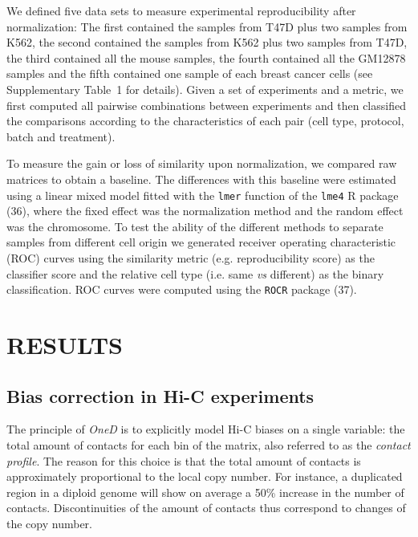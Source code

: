 \documentclass[a4,center,fleqn]{NAR}
\providecommand{\DIFadd}[1]{{\protect\color{red}#1}} %
\providecommand{\DIFdel}[1]{{\protect}}                      %
\providecommand{\DIFaddbegin}{} %
\providecommand{\DIFaddend}{} %
\providecommand{\DIFdelbegin}{} %
\providecommand{\DIFdelend}{} %
\begin{document}
We defined \DIFdelbegin \DIFdel{three }\DIFdelend \DIFaddbegin \DIFadd{five }\DIFaddend data sets to measure experimental reproducibility after
normalization: The first contained the samples from T47D plus two samples
from K562, the second contained the samples from K562 plus two samples
from T47D, the third contained all the mouse samples\DIFdelbegin \DIFdel{(see Table
\ref{tab:samples} }\DIFdelend \DIFaddbegin \DIFadd{, the fourth contained
all the GM12878 samples and the fifth contained one sample of each breast
cancer cells (see Supplementary Table~1 }\DIFaddend for details). Given a set of
experiments and a metric, we first computed all pairwise combinations
between experiments and then classified the comparisons according to the
characteristics of each pair (cell type, protocol, batch and treatment).

To measure the gain or loss of similarity upon normalization, we compared
raw matrices to obtain a baseline. The differences with this baseline were
estimated using a linear mixed model fitted with the \texttt{lmer}
function of the \texttt{lme4} R package (\DIFdelbegin \DIFdel{37}\DIFdelend \DIFaddbegin \DIFadd{36}\DIFaddend ), where the
fixed effect was the normalization method and the random effect was the
chromosome. \DIFdelbegin \DIFdel{Receiver }\DIFdelend \DIFaddbegin \DIFadd{To test the ability of the different methods to separate
samples from different cell origin we generated receiver }\DIFaddend operating
characteristic (ROC) curves \DIFaddbegin \DIFadd{using the similarity metric (e.g.
reproducibility score) as the classifier score and the relative cell type
(i.e. same }\textit{\DIFadd{vs}} \DIFadd{different) as the binary classification. ROC curves
}\DIFaddend were computed using the \texttt{ROCR} package (\DIFdelbegin \DIFdel{38}\DIFdelend \DIFaddbegin \DIFadd{37}\DIFaddend ).

\section{RESULTS}

\subsection{\DIFdelbegin \DIFdel{Experimental bias }\DIFdelend \DIFaddbegin \DIFadd{Bias }\DIFaddend correction \DIFaddbegin \DIFadd{in Hi-C experiments}\DIFaddend }

The principle of \textit{OneD} is to explicitly model Hi-C biases on a
single variable: the total amount of contacts for each bin of the matrix\DIFdelbegin \DIFdel{(see \ref{sec:model} for detail)}\DIFdelend \DIFaddbegin \DIFadd{,
also referred to as the }\textit{\DIFadd{contact profile}}\DIFaddend . The reason for this
choice is that the total amount of contacts is approximately proportional
to the local copy number. For instance, a duplicated region in a diploid
genome will show on average a 50\% increase in the number of contacts.
Discontinuities of the amount of contacts thus correspond to changes of
the copy number.
\end{document}
